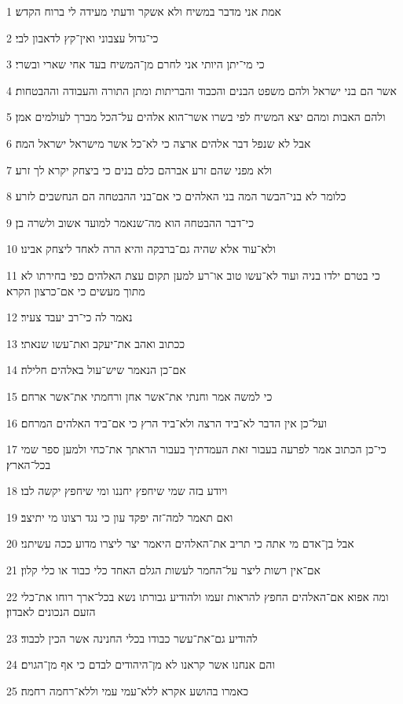 \par 1 אמת אני מדבר במשיח ולא אשקר ודעתי מעידה לי ברוח הקדש׃
\par 2 כי־גדול עצבוני ואין־קץ לדאבון לבי׃
\par 3 כי מי־יתן היותי אני לחרם מן־המשיח בעד אחי שארי ובשרי׃
\par 4 אשר הם בני ישראל ולהם משפט הבנים והכבוד והבריתות ומתן התורה והעבודה וההבטחות׃
\par 5 ולהם האבות ומהם יצא המשיח לפי בשרו אשר־הוא אלהים על־הכל מברך לעולמים אמן׃
\par 6 אבל לא שנפל דבר אלהים ארצה כי לא־כל אשר מישראל ישראל המה׃
\par 7 ולא מפני שהם זרע אברהם כלם בנים כי ביצחק יקרא לך זרע׃
\par 8 כלומר לא בני־הבשר המה בני האלהים כי אם־בני ההבטחה הם הנחשבים לזרע׃
\par 9 כי־דבר ההבטחה הוא מה־שנאמר למועד אשוב ולשרה בן׃
\par 10 ולא־עוד אלא שהיה גם־ברבקה והיא הרה לאחד ליצחק אבינו׃
\par 11 כי בטרם ילדו בניה ועוד לא־עשו טוב או־רע למען תקום עצת האלהים כפי בחירתו לא מתוך מעשים כי אם־כרצון הקרא׃
\par 12 נאמר לה כי־רב יעבד צעיר׃
\par 13 ככתוב ואהב את־יעקב ואת־עשו שנאתי׃
\par 14 אם־כן הנאמר שיש־עול באלהים חלילה׃
\par 15 כי למשה אמר וחנתי את־אשר אחן ורחמתי את־אשר ארחם׃
\par 16 ועל־כן אין הדבר לא־ביד הרצה ולא־ביד הרץ כי אם־ביד האלהים המרחם׃
\par 17 כי־כן הכתוב אמר לפרעה בעבור זאת העמדתיך בעבור הראתך את־כחי ולמען ספר שמי בכל־הארץ׃
\par 18 ויודע בזה שמי שיחפץ יחננו ומי שיחפץ יקשה לבו׃
\par 19 ואם תאמר למה־זה יפקד עון כי נגד רצונו מי יתיצב׃
\par 20 אבל בן־אדם מי אתה כי תריב את־האלהים היאמר יצר ליצרו מדוע ככה עשיתני׃
\par 21 אם־אין רשות ליצר על־החמר לעשות הגלם האחד כלי כבוד או כלי קלון׃
\par 22 ומה אפוא אם־האלהים החפץ להראות זעמו ולהודיע גבורתו נשא בכל־ארך רוחו את־כלי הזעם הנכונים לאבדון׃
\par 23 להודיע גם־את־עשר כבודו בכלי החנינה אשר הכין לכבוד׃
\par 24 והם אנחנו אשר קראנו לא מן־היהודים לבדם כי אף מן־הגוים׃
\par 25 כאמרו בהושע אקרא ללא־עמי עמי וללא־רחמה רחמה׃

